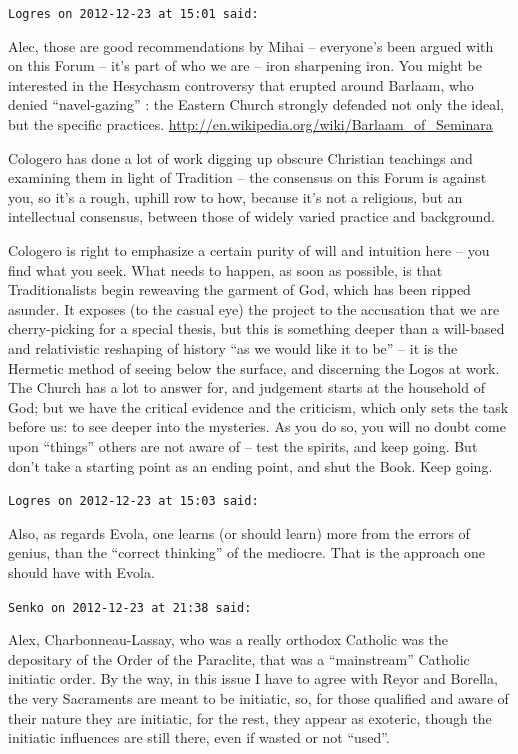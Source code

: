 \begin{footnotesize}
\begin{sffamily}
\hfill

\texttt{Logres on 2012-12-23 at 15:01 said:}

Alec, those are good recommendations by Mihai -- everyone's been argued with on this Forum -- it's part of who we are -- iron sharpening iron. You might be interested in the Hesychasm controversy that erupted around Barlaam, who denied ``navel-gazing'' : the Eastern Church strongly defended not only the ideal, but the specific practices.
\url{http://en.wikipedia.org/wiki/Barlaam_of_Seminara}

Cologero has done a lot of work digging up obscure Christian teachings and examining them in light of Tradition -- the consensus on this Forum is against you, so it's a rough, uphill row to how, because it's not a religious, but an intellectual consensus, between those of widely varied practice and background.

Cologero is right to emphasize a certain purity of will and intuition here -- you find what you seek. What needs to happen, as soon as possible, is that Traditionalists begin reweaving the garment of God, which has been ripped asunder. It exposes (to the casual eye) the project to the accusation that we are cherry-picking for a special thesis, but this is something deeper than a will-based and relativistic reshaping of history ``as we would like it to be'' -- it is the Hermetic method of seeing below the surface, and discerning the Logos at work. The Church has a lot to answer for, and judgement starts at the household of God; but we have the critical evidence and the criticism, which only sets the task before us: to see deeper into the mysteries. As you do so, you will no doubt come upon ``things'' others are not aware of -- test the spirits, and keep going. But don't take a starting point as an ending point, and shut the Book. Keep going.

\hfill

\texttt{Logres on 2012-12-23 at 15:03 said:}

Also, as regards Evola, one learns (or should learn) more from the errors of genius, than the ``correct thinking'' of the mediocre. That is the approach one should have with Evola.

\hfill

\texttt{Senko on 2012-12-23 at 21:38 said:}

Alex, Charbonneau-Lassay, who was a really orthodox Catholic was the depositary of the Order of the Paraclite, that was a ``mainstream'' Catholic initiatic order. By the way, in this issue I have to agree with Reyor and Borella, the very Sacraments are meant to be initiatic, so, for those qualified and aware of their nature they are initiatic, for the rest, they appear as exoteric, though the initiatic influences are still there, even if wasted or not ``used''.


\end{sffamily}
\end{footnotesize}
